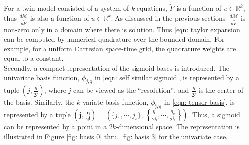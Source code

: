 For a twin model consisted of a system of $k$ equations,
$\tilde{F}$ is a function of $u\in\mathbb{R}^k$, thus 
$\frac{d\mathcal{M}}{d\tilde{F}}$ is also a function of $u\in\mathbb{R}^k$.
As discussed in the previous sections, $\frac{d \mathcal{M}}{d\tilde{F}}$ is non-zero only in a
domain where there is solution. Thus \eqref{eqn: taylor expansion} 
can be computed by numerical quadrature over the bounded domain.
For example, for a uniform Cartesian space-time grid, the quadrature weights are equal to a constant.
\\

Secondly, a compact representation of the sigmoid bases is introduced.
The univariate basis function, $\phi_{j,\eta}$ in
\eqref{eqn: self similar sigmoid}, is represented by a tuple $(j, \frac{\eta}{2^j})$,
where $j$ can be viewed as the ``resolution'', and $\frac{\eta}{2^j}$ is
the center of the basis.
Similarly, the $k$-variate basis function, $\phi_{\boldsymbol{j}, \boldsymbol{\eta}}$ in
\eqref{eqn: tensor basis}, is represented by a tuple $\left(\boldsymbol{j}, \,
\frac{\boldsymbol{\eta}}{2^{\boldsymbol{j}}}\right) 
= \left(\{j_1,\cdots, j_k\}, \, \left\{\frac{\eta_1}{2^{j_1}}, \cdots, \frac{\eta_k}{2^{j_k}}\right\}\right)$.
Thus, a sigmoid can be represented by a point in a $2k$-dimensional space.
The representation is illustrated in Figure \ref{fig: basis 0} thru. \ref{fig: basis 3} 
for the univariate case.
